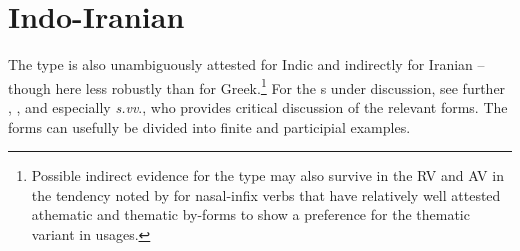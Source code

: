 \documentclass[output=paper,colorlinks,citecolor=brown]{langscibook}
\begin{document}
\section{Indo-Iranian}
\label{sec:IIr}

The type is also unambiguously attested for Indic and indirectly for Iranian -- though here less robustly than for Greek.\footnote{Possible indirect evidence for the type may also survive in the RV and AV in the tendency noted by \citealt{Kulikov2000} for nasal-infix verbs that have relatively well attested athematic and thematic by-forms to show a preference for the thematic variant in  usages.} For the s under discussion, see further \citealt{Kulikov2000}, \citealt{Hill2007}, and especially \citealt{Zasada2021} \textit{s.vv}., who provides critical discussion of the relevant forms. The forms can usefully be divided into finite and participial examples. 
\end{document}
